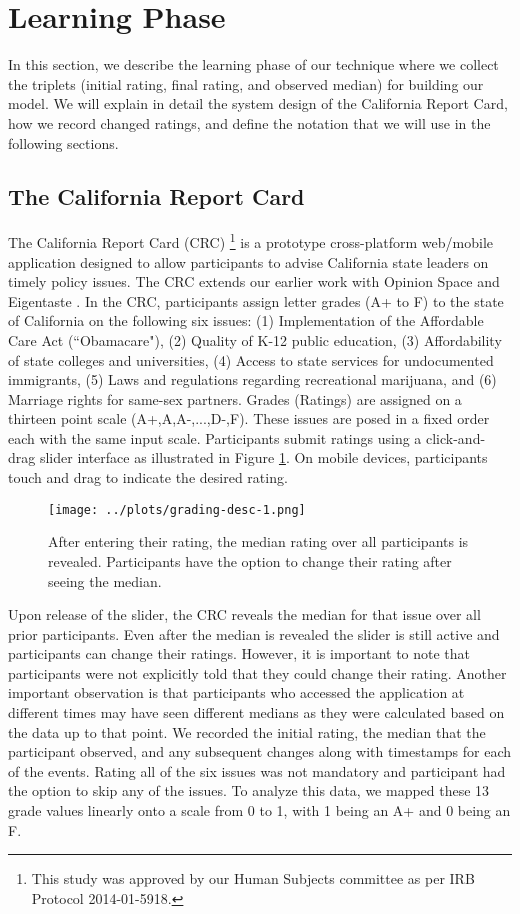 \section{Learning Phase}
In this section, we describe the learning phase of our technique where we collect the triplets (initial rating, final rating, and observed median) for building our model.
We will explain in detail the system design of the California Report Card, how we record changed ratings, and define the notation that we will use in the following sections.

\subsection{The California Report Card}
The California Report Card (CRC) \footnote{This study was approved by our Human Subjects committee as per IRB Protocol 2014-01-5918.} is a prototype cross-platform web/mobile application designed to allow participants to advise California state leaders on timely policy issues.
The CRC extends our earlier work with Opinion Space and Eigentaste \cite{faridani2011using, bitton2009spatial, faridani2010opinion, nathanson2007eigentaste, goldberg2001eigentaste}.
In the CRC, participants assign letter grades (A+ to F) to the state of California on the following six issues: (1) Implementation of the Affordable Care Act (``Obamacare"),
(2) Quality of K-12 public education, (3) Affordability of state colleges and universities, (4) Access to state services for undocumented immigrants, (5) Laws and regulations regarding recreational marijuana, and (6) Marriage rights for same-sex partners.
Grades (Ratings) are assigned on a thirteen point scale (A+,A,A-,...,D-,F).
These issues are posed in a fixed order each with the same input scale.
Participants submit ratings using a click-and-drag slider interface as illustrated in Figure \ref{grading-1}.
On mobile devices, participants touch and drag to indicate the desired rating.

\begin{figure}[h]
  \centering
    \texttt{[image: ../plots/grading-desc-1.png]}
      \caption{After entering their rating, the median rating over all participants is revealed. Participants have the option to change their rating after seeing the median.}
      \label{grading-1}
\end{figure}

Upon release of the slider, the CRC reveals the median for that issue over all prior participants.
Even after the median is revealed the slider is still active and participants can change their ratings.
However, it is important to note that participants were not explicitly told that they could change their rating.
Another important observation is that participants who accessed the application at different times may have seen different medians as they were calculated based on the data up to that point.
We recorded the initial rating, the median that the participant observed, and any subsequent changes along with timestamps for each of the events. 
Rating all of the six issues was not mandatory and participant had the option to skip any of the issues.
To analyze this data, we mapped these 13 grade values linearly onto a scale from 0 to 1, with 1 being an A+ and 0 being an F.


